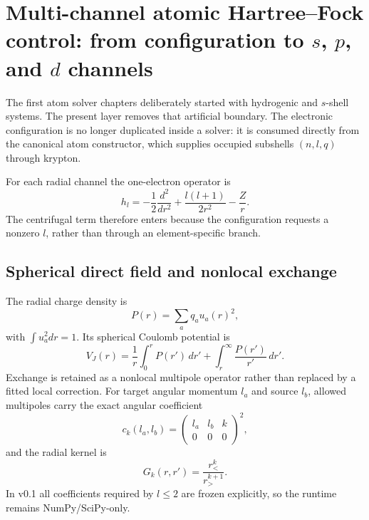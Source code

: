 \section{Multi-channel atomic Hartree--Fock control: from configuration to $s$, $p$, and $d$ channels}
\label{sec:multichannel-atomic-hf}

The first atom solver chapters deliberately started with hydrogenic and $s$-shell systems.  The present layer removes that artificial boundary.  The electronic configuration is no longer duplicated inside a solver: it is consumed directly from the canonical atom constructor, which supplies occupied subshells $(n,l,q)$ through krypton.

For each radial channel the one-electron operator is
\begin{equation}
 h_l=-\frac12\frac{d^2}{dr^2}+\frac{l(l+1)}{2r^2}-\frac{Z}{r}.
\end{equation}
The centrifugal term therefore enters because the configuration requests a nonzero $l$, rather than through an element-specific branch.

\subsection{Spherical direct field and nonlocal exchange}
The radial charge density is
\begin{equation}
 P(r)=\sum_a q_a u_a(r)^2,
\end{equation}
with $\int u_a^2dr=1$.  Its spherical Coulomb potential is
\begin{equation}
 V_J(r)=\frac1r\int_0^r P(r')\,dr'+\int_r^\infty\frac{P(r')}{r'}\,dr'.
\end{equation}
Exchange is retained as a nonlocal multipole operator rather than replaced by a fitted local correction.  For target angular momentum $l_a$ and source $l_b$, allowed multipoles carry the exact angular coefficient
\begin{equation}
 c_k(l_a,l_b)=
 \begin{pmatrix}
 l_a & l_b & k\\
 0 & 0 & 0
 \end{pmatrix}^{\!2},
\end{equation}
and the radial kernel is
\begin{equation}
 G_k(r,r')=\frac{r_<^k}{r_>^{k+1}}.
\end{equation}
In v0.1 all coefficients required by $l\le2$ are frozen explicitly, so the runtime remains NumPy/SciPy-only.

